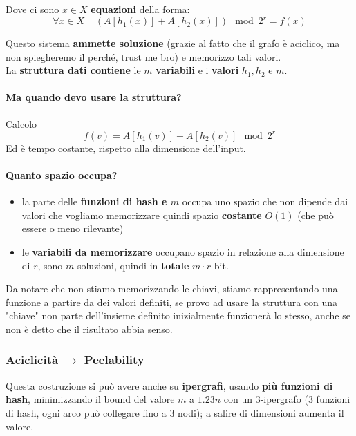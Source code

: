 Dove ci sono $x \in X$ \textbf{equazioni} della forma:
$$ \forall x \in X \;\;\;\; \left(A[h_1 (x)] + A[h_2(x)]\right) \mod 2^r = f(x) $$

Questo sistema \textbf{ammette soluzione} (grazie al fatto che il grafo è aciclico, ma non spiegheremo il perché, trust me bro) e memorizzo tali valori.\\

La \textbf{struttura dati contiene} le $m$ \textbf{variabili} e i \textbf{valori} $h_1,h_2$ e $m$.\\

\paragraph{Ma quando devo usare la struttura?} Calcolo
$$ f(v) = A[h_1(v)] + A[h_2 (v)] \mod 2^r $$
Ed è tempo costante, rispetto alla dimensione dell'input.\\

\paragraph{Quanto spazio occupa?}
\begin{itemize}
	\item la parte delle \textbf{funzioni di hash e $m$} occupa uno spazio che non dipende dai valori che vogliamo memorizzare quindi spazio \textbf{costante} $O(1)$ (che può essere o meno rilevante)
	\item le \textbf{variabili da memorizzare} occupano spazio in relazione alla dimensione di $r$, sono $m$ soluzioni, quindi in \textbf{totale} $m \cdot r$ bit.\\
\end{itemize}

Da notare che non stiamo memorizzando le chiavi, stiamo rappresentando una funzione a partire da dei valori definiti, se provo ad usare la struttura con una "chiave" non parte dell'insieme definito inizialmente funzionerà lo stesso, anche se non è detto che il risultato abbia senso.\\

\newpage

\subsubsection{Aciclicità $\rightarrow$ Peelability}
Questa costruzione si può avere anche su \textbf{ipergrafi}, usando \textbf{più funzioni di hash}, minimizzando il bound del valore $m$ a $1.23n$ con un 3-ipergrafo (3 funzioni di hash, ogni arco può collegare fino a 3 nodi); a salire di dimensioni aumenta il valore.\\

